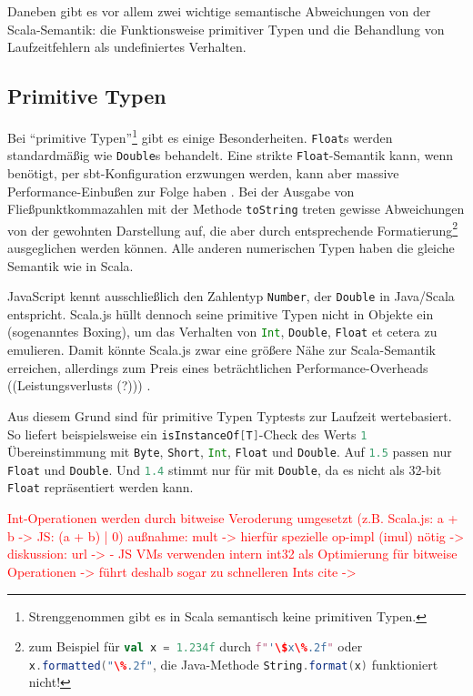 \documentclass[a4paper, 12pt, hidelinks, listof=totoc, listoftables=totoc, bibliography=totoc]{scrreprt}
\newcommand{\scala}[1]{\lstinline[language=Scala, style=inline]|#1|}
\newcommand{\TODO}[1]{\textcolor{red}{#1}\newline}
\begin{document}
Daneben gibt es vor allem zwei wichtige semantische Abweichungen von der Scala-Semantik: die Funktionsweise primitiver Typen und die Behandlung von Laufzeitfehlern als undefiniertes Verhalten.


\subsection{Primitive Typen}

Bei "`primitive Typen"'\footnote{Strenggenommen gibt es in Scala semantisch keine primitiven Typen.} gibt es einige Besonderheiten. \scala{Float}s werden standardmäßig wie \scala{Double}s behandelt. Eine strikte \scala{Float}-Semantik kann, wenn benötigt, per sbt-Konfiguration erzwungen werden, kann aber massive Performance-Einbußen zur Folge haben \cite[S.~2]{doeraene2013.TDI}\cite{scalajs.DSS}. 
Bei der Ausgabe von Fließpunktkommazahlen mit der Methode \scala{toString} treten gewisse Abweichungen von der gewohnten Darstellung auf, die aber durch entsprechende Formatierung\footnote{zum Beispiel für \scala{val x = 1.234f} durch \scala{f"'\$x\%.2f"} oder \scala{x.formatted("\%.2f"}, die Java-Methode \scala{String.format(x)} funktioniert nicht!} ausgeglichen werden können. Alle anderen numerischen Typen haben die gleiche Semantik wie in Scala. 

JavaScript kennt ausschließlich den Zahlentyp \scala{Number}, der \scala{Double} in Java/Scala entspricht. Scala.js hüllt dennoch seine primitive Typen nicht in Objekte ein (sogenanntes Boxing), um das Verhalten von \scala{Int}, \scala{Double}, \scala{Float} et cetera zu emulieren. Damit könnte Scala.js zwar eine größere Nähe zur Scala-Semantik erreichen, allerdings zum Preis eines beträchtlichen Performance-Overheads ((Leistungsverlusts (?)))
\cite[S. 2]{doeraene2013.TDI}\cite[\#ThePerformance/CorrectnessTradeoff]{haoyi.HOS}.

Aus diesem Grund sind für primitive Typen Typtests zur Laufzeit wertebasiert. 
So liefert beispielsweise ein \scala{isInstanceOf[T]}-Check des Werts \scala{1} Übereinstimmung mit \scala{Byte}, \scala{Short}, \scala{Int}, \scala{Float} und \scala{Double}. Auf \scala{1.5} passen nur \scala{Float} und \scala{Double}. Und \scala{1.4} stimmt nur für mit \scala{Double}, da es nicht als 32-bit \scala{Float} repräsentiert werden kann.\cite{scalajs.DSS}

\TODO{Int-Operationen werden durch bitweise Veroderung umgesetzt (z.B. Scala.js: a + b -> JS: (a + b) | 0)}
\TODO{außnahme: mult -> hierfür spezielle op-impl (imul) nötig  -> diskussion: url -> %
}
\TODO{- JS VMs verwenden intern int32 als Optimierung für bitweise Operationen}
\TODO{-> führt deshalb sogar zu schnelleren Ints}
\TODO{cite -> %
}
\end{document}
